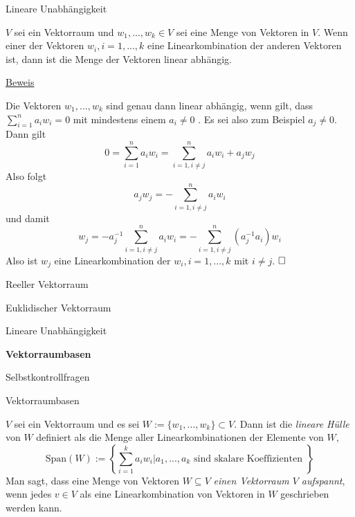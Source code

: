 \documentclass[
  8pt,
  ignorenonframetext,
]{beamer}
\begin{document}
\begin{frame}{Lineare Unabhängigkeit}
\protect\hypertarget{lineare-unabhuxe4ngigkeit-3}{}
\small
\begin{theorem}
\justifying
\normalfont
$V$ sei ein Vektorraum und $w_1,...,w_k \in V$ sei eine Menge von Vektoren in $V$.
Wenn einer der Vektoren $w_i, i = 1,...,k$ eine Linearkombination der anderen
Vektoren ist, dann ist die Menge der Vektoren linear abhängig.
\end{theorem}

\footnotesize

\underline{Beweis}

Die Vektoren \(w_1,...,w_k\) sind genau dann linear abhängig, wenn gilt,
dass \(\sum_{i=1}^n a_i w_i = 0\) mit mindestens einem \(a_i \neq 0\) .
Es sei also zum Beispiel \(a_j \neq 0\). Dann gilt \begin{equation}
0 = \sum_{i=1}^n a_i w_i = \sum_{i=1, i \neq j}^n a_i w_i + a_jw_j
\end{equation} Also folgt \begin{equation}
a_jw_j  = - \sum_{i=1, i \neq j}^n a_i w_i
\end{equation} und damit \begin{equation}
w_j  = - a_j^{-1}\sum_{i=1, i \neq j}^n a_i w_i = - \sum_{i=1, i \neq j}^n (a_j^{-1}a_i) w_i
\end{equation} Also ist \(w_j\) eine Linearkombination der
\(w_i, i = 1,...,k\) mit \(i \neq j\). \(\hfill \Box\)
\end{frame}

\begin{frame}{}
\protect\hypertarget{section-7}{}
\large
\vfill

Reeller Vektorraum

Euklidischer Vektorraum

Lineare Unabhängigkeit

\textbf{Vektorraumbasen}

Selbstkontrollfragen \vfill
\end{frame}

\begin{frame}{Vektorraumbasen}
\protect\hypertarget{vektorraumbasen}{}
\small
\begin{definition}
\justifying
$V$ sei ein Vektorraum und es sei $W := \{w_1,...,w_k\} \subset V$. Dann ist die
\textit{lineare Hülle} von $W$ definiert als die Menge aller Linearkombinationen
der Elemente von $W$,
\begin{equation}
\mbox{Span}(W) := \left\lbrace \sum_{i=1}^k a_iw_i \vert a_1,...,a_k \mbox{ sind skalare Koeffizienten } \right\rbrace
\end{equation}
Man sagt, dass eine Menge von Vektoren $W \subseteq V$ \textit{einen Vektorraum $V$ aufspannt},
wenn jedes $v \in V$ als eine Linearkombination von Vektoren in $W$ geschrieben werden kann.
\end{definition}
\end{frame}
\end{document}
